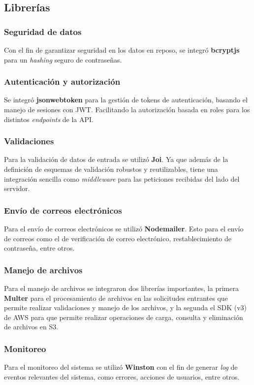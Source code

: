 \subsection{Librerías}

\subsubsection{Seguridad de datos}
Con el fin de garantizar seguridad en los datos en reposo, se integró \textbf{bcryptjs} para un \textit{\gls{hashing}} seguro de
contraseñas.

\subsubsection{Autenticación y autorización}
Se integró \textbf{jsonwebtoken} para la gestión de tokens de autenticación, basando el manejo de sesiones con JWT. Facilitando 
la autorización basada en roles para los distintos \textit{endpoints} de la API.

\subsubsection{Validaciones}
Para la validación de datos de entrada se utilizó \textbf{Joi}. Ya que además de la definición de esquemas de validación robustos
y reutilizables, tiene una integración sencilla como \textit{middleware} para las peticiones recibidas del lado del servidor.

\subsubsection{Envío de correos electrónicos}
Para el envío de correos electrónicos se utilizó \textbf{Nodemailer}. Esto para el envío de correos como el de verificación de 
correo electrónico, restablecimiento de contraseña, entre otros.

\subsubsection{Manejo de archivos}
Para el manejo de archivos se integraron dos librerías importantes, la primera \textbf{Multer} para el procesamiento de archivos
en las solicitudes entrantes que permite realizar validaciones y manejo de los archivos, y la segunda el SDK (v3) de AWS para 
que permite realizar operaciones de carga, consulta y eliminación de archivos en S3.

\subsubsection{Monitoreo}
Para el monitoreo del sistema se utilizó \textbf{Winston} con el fin de generar \textit{\gls{log}} de eventos relevantes del
sistema, como errores, acciones de usuarios, entre otros.


